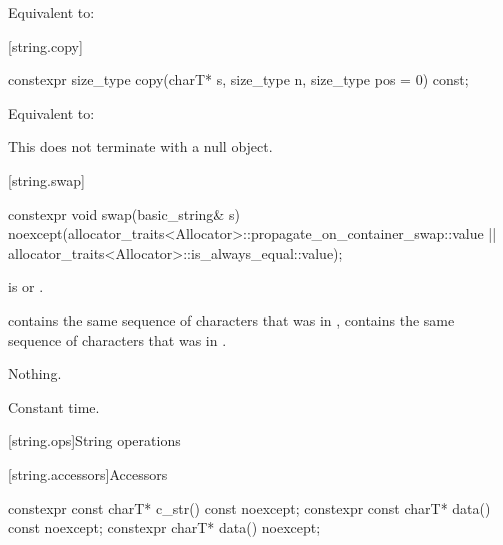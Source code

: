 \begin{itemdescr}
\pnum
\effects
Equivalent to: 
\end{itemdescr}

[string.copy]{}

%
\begin{itemdecl}
constexpr size_type copy(charT* s, size_type n, size_type pos = 0) const;
\end{itemdecl}

\begin{itemdescr}
\pnum
\effects
Equivalent to:
\begin{note}
This does not terminate  with a null object.
\end{note}
\end{itemdescr}

[string.swap]{}

%
\begin{itemdecl}
constexpr void swap(basic_string& s)
  noexcept(allocator_traits<Allocator>::propagate_on_container_swap::value ||
           allocator_traits<Allocator>::is_always_equal::value);
\end{itemdecl}

\begin{itemdescr}
\pnum
\expects
{} is 
or
.

\pnum
\ensures
{}
contains the same sequence of characters that was in ,
 contains the same sequence of characters that was in
.

\pnum
\throws
Nothing.

\pnum
\complexity
Constant time.
\end{itemdescr}

[string.ops]{String operations}

[string.accessors]{Accessors}

%
%
\begin{itemdecl}
constexpr const charT* c_str() const noexcept;
constexpr const charT* data() const noexcept;
constexpr charT* data() noexcept;
\end{itemdecl}

